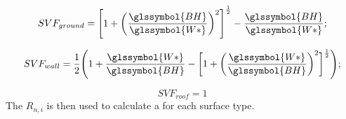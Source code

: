 \documentclass[final,3p,times,authoryear]{elsarticle}
\begin{document}
\begin{equation}
SVF_{ground} = \Bigg[1+\bigg(\frac{\glssymbol{BH}}{\glssymbol{W*}}\bigg)^2\Bigg]^\frac{1}{2} - \frac{\glssymbol{BH}}{\glssymbol{W*}} ;
\end{equation} 

\begin{equation}
SVF_{wall} = \frac{1}{2} \Bigg( 1 + \frac{\glssymbol{W*}}{\glssymbol{BH}} - \bigg[ 1 + \bigg(\frac{\glssymbol{W*}}{\glssymbol{BH}}\bigg)^2\bigg]^\frac{1}{2} \Bigg) ;
\end{equation}

\begin{equation}
SVF_{roof} = 1
\end{equation} The $R_{n,i}$ is then used to calculate a  for each surface type.

\begin{table}
\begin{center}


\end{center}
\end{table}
\end{document}
